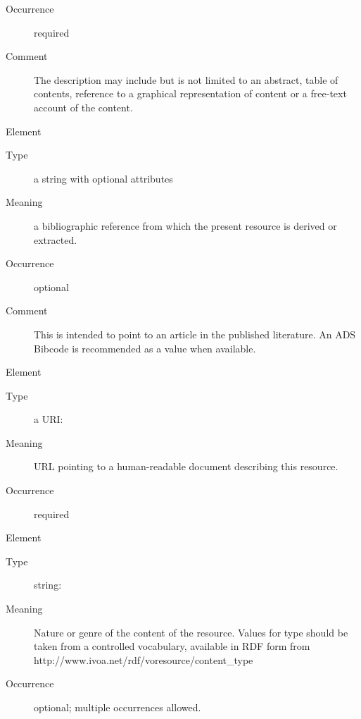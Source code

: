 \documentclass[11pt,a4paper]{ivoa}
\begin{document}
\begin{generated}
\begin{bigdescription}
\begin{description}
\item[Occurrence] required
\item[Comment] 
               The description may include but is not limited to an abstract, 
               table of contents, reference to a graphical representation of
               content or a free-text account of the content.
             

\end{description}
\item[Element \xmlel{source}]
\begin{description}
\item[Type] a string with optional attributes
\item[Meaning] 
                a bibliographic reference from which the present resource is 
                derived or extracted.  
             
\item[Occurrence] optional
\item[Comment] 
                This is intended to point to an article in the published 
                literature.  An ADS Bibcode is recommended as a value when 
                available.    
             

\end{description}
\item[Element \xmlel{referenceURL}]
\begin{description}
\item[Type] a URI: 
\item[Meaning] 
                URL pointing to a human-readable document describing this 
                resource.   
             
\item[Occurrence] required

\end{description}
\item[Element \xmlel{type}]
\begin{description}
\item[Type] string: 
\item[Meaning] 
               Nature or genre of the content of the resource.  Values for
               type should be taken from a controlled vocabulary, available 
               in RDF form from
               http://www.ivoa.net/rdf/voresource/content\_type
             
\item[Occurrence] optional; multiple occurrences allowed.


\end{description}
\end{bigdescription}
\end{generated}
\end{document}
